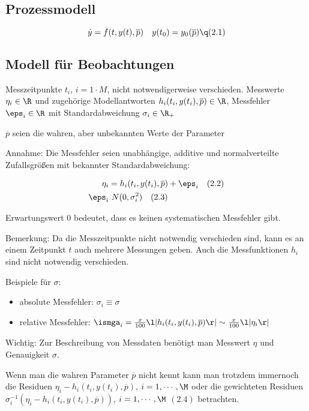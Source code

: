\subsection*{Prozessmodell}

\[\dot y = f(t,y(t),\overline p) \quad y(t_0) = y_0(\overline p) \q (2.1)\]

\subsection*{Modell für Beobachtungen}

Messzeitpunkte $t_i$, $i=1\cdot M$, nicht notwendigerweise verschieden. Messwerte $\eta_i \in \R$ und zugehörige Modellantworten $h_i (t_i, y(t_i), \overline p) \in \R$, Messfehler $\eps_i \in \R$ mit Standardabweichung $\sigma_i \in \R_+$

$\overline p$ seien die wahren, aber unbekannten Werte der Parameter

Annahme: Die Messfehler seien unabhängige, additive und normalverteilte Zufallsgrößen mit bekannter Standardabweichung:

\begin{align*}
\eta_i &= h_i(t_i, y(t_i), \overline p) + \eps_i \quad (2.2) \\
\eps_i &~ N(0, \sigma_i^2) \quad (2.3)
\end{align*}

Erwartungswert $0$ bedeutet, dass es keinen systematischen Messfehler gibt.

Bemerkung: Da die Messzeitpunkte nicht notwendig verschieden sind, kann es an einem Zeitpunkt $t$ auch mehrere Messungen geben. Auch die Messfunktionen $h_i$ sind nicht notwendig verschieden.

Beispiele für $\sigma:$

\begin{itemize}
\item absolute Messfehler: $\sigma_i \equiv \sigma$
\item relative Messfehler: $\ismga_i =  \frac x{100} \l| h_i(t_i,y(t_i),\overline p) \r| \sim \frac x{100} \l|\eta_i\r|$
\end{itemize}

Wichtig: Zur Beschreibung von Messdaten benötigt man Messwert $\eta$ und Genauigkeit $\sigma$.

Wenn man die wahren Parameter $\overline p$ nicht kennt kann man trotzdem immernoch die Residuen $\eta_i-h_i(t_i,y(t_i), \overline p)$, $i=1,\cdots,\M$ oder die gewichteten Residuen $\sigma_i^{-1}(\eta_i-h_i(t_i,y(t_i), \overline p))$, $i=1,\cdots,\M$ $(2.4)$  betrachten.

